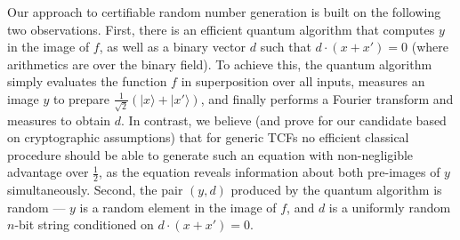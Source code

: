 \documentclass[11pt]{article}
\theoremstyle{remark}
\theoremstyle{definition}
\newcommand{\ket}[1]{|#1\rangle}
\begin{document}
Our approach to certifiable random number generation is built on the following two observations. First, there is an efficient quantum algorithm that 
computes $y$ in the image of $f$, as well as a binary vector $d$ such that  $d\cdot(x + x') = 0$ (where arithmetics are over the binary field). To achieve this, the quantum algorithm simply evaluates the function $f$ in superposition over all inputs, measures an image $y$ to prepare $\frac{1}{\sqrt{2}}(\ket{x}+\ket{x'})$, and finally performs a Fourier transform and measures to obtain $d$. In contrast, we 
believe (and prove for our candidate based on cryptographic assumptions) that for generic TCFs no efficient classical procedure should be able to generate such an equation with non-negligible advantage over $\frac{1}{2}$, as the equation reveals information about both pre-images of $y$ simultaneously. Second, the pair $(y, d)$ produced by the quantum 
algorithm is random --- $y$ is a random element in the image of $f$, and $d$ is a uniformly random $n$-bit string conditioned on $d\cdot(x + x') = 0$.

\end{document}
